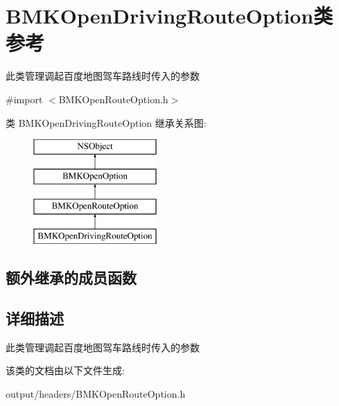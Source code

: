 \hypertarget{interface_b_m_k_open_driving_route_option}{}\section{B\+M\+K\+Open\+Driving\+Route\+Option类 参考}
\label{interface_b_m_k_open_driving_route_option}


此类管理调起百度地图驾车路线时传入的参数  




{\ttfamily \#import $<$B\+M\+K\+Open\+Route\+Option.\+h$>$}

类 B\+M\+K\+Open\+Driving\+Route\+Option 继承关系图\+:\begin{figure}[H]
\begin{center}
\leavevmode
\includegraphics[height=4.000000cm]{interface_b_m_k_open_driving_route_option}
\end{center}
\end{figure}
\subsection*{额外继承的成员函数}


\subsection{详细描述}
此类管理调起百度地图驾车路线时传入的参数 

该类的文档由以下文件生成\+:\begin{DoxyCompactItemize}
\item 
output/headers/B\+M\+K\+Open\+Route\+Option.\+h\end{DoxyCompactItemize}
